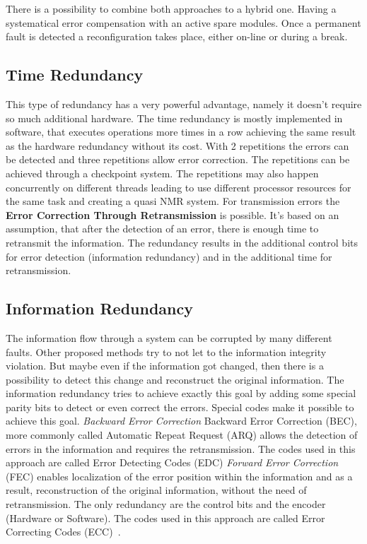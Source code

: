 There is a possibility to combine both approaches to a hybrid one. Having a systematical error compensation with an active spare modules. Once a permanent fault is detected a reconfiguration takes place, either on-line or during a break.


\subsection{Time Redundancy}
This type of redundancy has a very powerful advantage, namely it doesn't require so much additional hardware. The time redundancy is mostly implemented in software, that executes operations more times in a row achieving the same result as the hardware redundancy without its cost. With 2 repetitions the errors can be detected and three repetitions allow error correction. The repetitions can be achieved through a checkpoint system. The repetitions may also happen concurrently on different threads leading to use different processor resources for the same task and creating a quasi NMR system. For transmission errors the \textbf{Error Correction Through Retransmission} is possible. It's based on an assumption, that after the detection of an error, there is enough time to retransmit the information. The redundancy results in the additional control bits for error detection (information redundancy) and in the additional time for retransmission.

\subsection{Information Redundancy}\label{ssec:Infred}
The information flow through a system can be corrupted by many different faults. Other proposed methods try to not let to the information integrity violation. But maybe even if the information got changed, then there is a possibility to detect this change and reconstruct the original information. The information redundancy tries to achieve exactly this goal by adding some special parity bits to detect or even correct the errors. Special codes make it possible to achieve this goal.
\textit{Backward Error Correction}
Backward Error Correction (BEC), more commonly called Automatic Repeat Request (ARQ) allows the detection of errors in the information and requires the retransmission. The codes used in this approach are called Error Detecting Codes (EDC)
\textit{Forward Error Correction} (FEC) enables localization of the error position within the information and as a result, reconstruction of the original information, without the need of retransmission. The only redundancy are the control bits and the encoder (Hardware or Software). The codes used in this approach are called Error Correcting Codes (ECC)~\cite{book:SchonfeldKlimant}.

